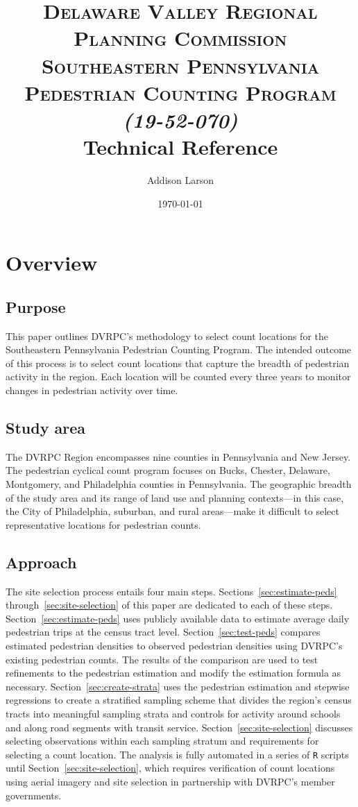 \documentclass[paper=letterpaper, fontsize=11pt]{scrartcl}
\title{	
\normalfont \normalsize 
\textsc{Delaware Valley Regional Planning Commission \\ Southeastern Pennsylvania Pedestrian Counting Program \textit{(19-52-070)}} \\ [25pt]
\huge Technical Reference \\
}
\author{Addison Larson}
\date{\normalsize\today}
\begin{document}
\renewcommand\UrlFont{\color{tealteal}\rmfamily}
\maketitle

\section{Overview}

\subsection{Purpose}

This paper outlines DVRPC's methodology to select count locations for the Southeastern Pennsylvania Pedestrian Counting Program. The intended outcome of this process is to select count locations that capture the breadth of pedestrian activity in the region. Each location will be counted every three years to monitor changes in pedestrian activity over time.

\subsection{Study area}
The DVRPC Region encompasses nine counties in Pennsylvania and New Jersey. The pedestrian cyclical count program focuses on Bucks, Chester, Delaware, Montgomery, and Philadelphia counties in Pennsylvania. The geographic breadth of the study area and its range of land use and planning contexts---in this case, the City of Philadelphia, suburban, and rural areas---make it difficult to select representative locations for pedestrian counts.

\subsection{Approach}
The site selection process entails four main steps. Sections~\ref{sec:estimate-peds} through~\ref{sec:site-selection} of this paper are dedicated to each of these steps. Section~\ref{sec:estimate-peds} uses publicly available data to estimate average daily pedestrian trips at the census tract level. Section~\ref{sec:test-peds} compares estimated pedestrian densities to observed pedestrian densities using DVRPC's existing pedestrian counts. The results of the comparison are used to test refinements to the pedestrian estimation and modify the estimation formula as necessary. Section~\ref{sec:create-strata} uses the pedestrian estimation and stepwise regressions to create a stratified sampling scheme that divides the region's census tracts into meaningful sampling strata and controls for activity around schools and along road segments with transit service. Section~\ref{sec:site-selection} discusses selecting observations within each sampling stratum and requirements for selecting a count location. The analysis is fully automated in a series of \texttt{R} scripts until Section~\ref{sec:site-selection}, which requires verification of count locations using aerial imagery and site selection in partnership with DVRPC's member governments. \\
\end{document}
